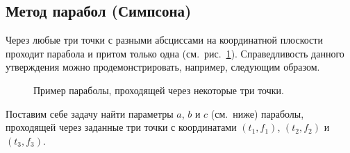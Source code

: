 \documentclass[12pt,a4paper,openany]{extarticle}
\begin{document}
\subsection{Метод парабол (Симпсона)}
\hspace*{\parindent}Через любые три точки с разными абсциссами на координатной плоскости проходит парабола и притом только одна (см.~рис.~\ref{fig:parabola_through_3_ponts}).
Справедливость данного утверждения можно продемонстрировать, например, следующим образом.

\begin{figure}[h!]
	\caption{Пример параболы, проходящей через некоторые три точки.}
	\label{fig:parabola_through_3_ponts}
\end{figure}

Поставим себе задачу найти параметры $a$, $b$ и $c$ (см.~ниже) параболы, проходящей через заданные три точки с координатами $(t_1, f_1)$, $(t_2, f_2)$ и $(t_3, f_3)$.
\end{document}
